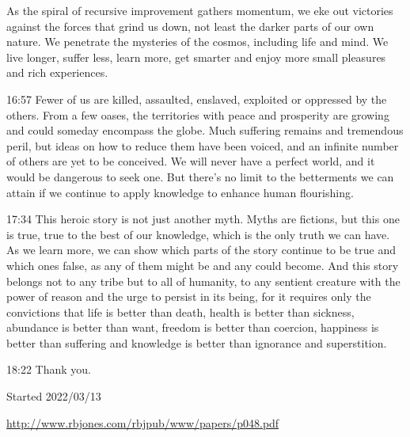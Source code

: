 \documentclass[10pt,titlepage]{article}
\begin{document}
As the spiral of recursive improvement
gathers momentum,
we eke out victories against the forces that grind us down,
not least the darker parts of our own nature.
We penetrate the mysteries of the cosmos, including life and mind.
We live longer, suffer less, learn more,
get smarter and enjoy more small pleasures
and rich experiences.

16:57
Fewer of us are killed, assaulted, enslaved, exploited
or oppressed by the others.
From a few oases, the territories with peace and prosperity are growing
and could someday encompass the globe.
Much suffering remains
and tremendous peril,
but ideas on how to reduce them have been voiced,
and an infinite number of others are yet to be conceived.
We will never have a perfect world,
and it would be dangerous to seek one.
But there's no limit to the betterments we can attain
if we continue to apply knowledge to enhance human flourishing.

17:34
This heroic story is not just another myth.
Myths are fictions, but this one is true,
true to the best of our knowledge, which is the only truth we can have.
As we learn more,
we can show which parts of the story continue to be true and which ones false,
as any of them might be and any could become.
And this story belongs not to any tribe
but to all of humanity,
to any sentient creature with the power of reason
and the urge to persist in its being,
for it requires only the convictions
that life is better than death,
health is better than sickness,
abundance is better than want,
freedom is better than coercion,
happiness is better than suffering
and knowledge is better than ignorance and superstition.

18:22
Thank you.

\cite{pinker-angels}


{}





\tiny{
Started 2022/03/13


\href{http://www.rbjones.com/rbjpub/www/papers/p048.pdf}{http://www.rbjones.com/rbjpub/www/papers/p048.pdf}

}%
\end{document}
